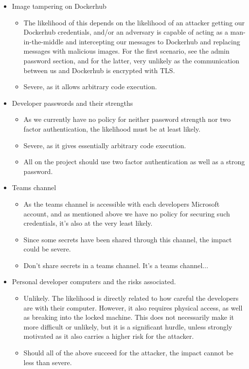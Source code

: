 \documentclass{article}
\begin{document}
\begin{itemize}
\begin{itemize}
    \end{itemize}
    \item Image tampering on Dockerhub
    \begin{itemize}
        \item The likelihood of this depends on the likelihood of an attacker getting our Dockerhub credentials, and/or an adversary is capable of acting as a man-in-the-middle and intercepting our messages to Dockerhub and replacing messages with malicious images. For the first scenario, see the admin password section, and for the latter, very unlikely as the communication between us and Dockerhub is encrypted with TLS.
        \item Severe, as it allows arbitrary code execution.
    \end{itemize}
    \item Developer passwords and their strengths
    \begin{itemize}
        \item As we currently have no policy for neither password strength nor two factor authentication, the likelihood must be at least likely.
        \item Severe, as it gives essentially arbitrary code execution.
        \item All on the project should use two factor authentication as well as a strong password.
    \end{itemize}
    \item Teams channel
    \begin{itemize}
        \item As the teams channel is accessible with each developers Microsoft account, and as mentioned above we have no policy for securing such credentials, it's also at the very least likely.
        \item Since some secrets have been shared through this channel, the impact could be severe.
        \item Don't share secrets in a teams channel. It's a teams channel...
    \end{itemize}
    \item Personal developer computers and the risks associated.
    \begin{itemize}
        \item Unlikely. The likelihood is directly related to how careful the developers are with their computer. However, it also requires physical access, as well as breaking into the locked machine. This does not necessarily make it more difficult or unlikely, but it is a significant hurdle, unless strongly motivated as it also carries a higher risk for the attacker.
        \item Should all of the above succeed for the attacker, the impact cannot be less than severe.
    \end{itemize}
\end{itemize}
\end{document}

